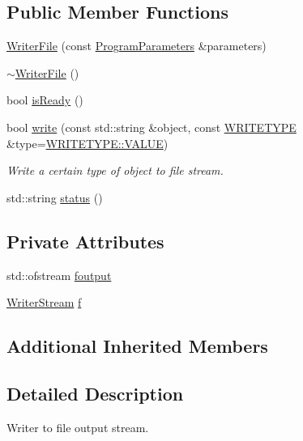 \subsection*{Public Member Functions}
\begin{DoxyCompactItemize}
\item 
\hyperlink{classWriterFile_a71ecabe84c75047ce63e2d1fc5b86e41}{Writer\+File} (const \hyperlink{structProgramParameters}{Program\+Parameters} \&parameters)
\item 
\hyperlink{classWriterFile_afcb8503eb87652be875d6e98ee7498d7}{$\sim$\+Writer\+File} ()
\item 
bool \hyperlink{classWriterFile_aaa16229f58daf8b74fbe8a59c9b1b166}{is\+Ready} ()
\item 
bool \hyperlink{classWriterFile_ac540d18943353e011428124a5afcc393}{write} (const std\+::string \&object, const \hyperlink{classWriterInterface_af35706b761b016972144a9333637d93d}{W\+R\+I\+T\+E\+T\+Y\+PE} \&type=\hyperlink{classWriterInterface_af35706b761b016972144a9333637d93daecc2e9c313faddb07e7da223c1dc5c3f}{W\+R\+I\+T\+E\+T\+Y\+P\+E\+::\+V\+A\+L\+UE})
\begin{DoxyCompactList}\small\item\em Write a certain type of object to file stream. \end{DoxyCompactList}\item 
std\+::string \hyperlink{classWriterFile_a538dd7bd3be5c0f3b930f215bf9f6ca7}{status} ()
\end{DoxyCompactItemize}
\subsection*{Private Attributes}
\begin{DoxyCompactItemize}
\item 
std\+::ofstream \hyperlink{classWriterFile_a846b117360d0cf149ec7bf02a375d025}{foutput}
\item 
\hyperlink{classWriterStream}{Writer\+Stream} \hyperlink{classWriterFile_a5fd0d35dace39b8716c78514893360bc}{f}
\end{DoxyCompactItemize}
\subsection*{Additional Inherited Members}


\subsection{Detailed Description}
Writer to file output stream. 

